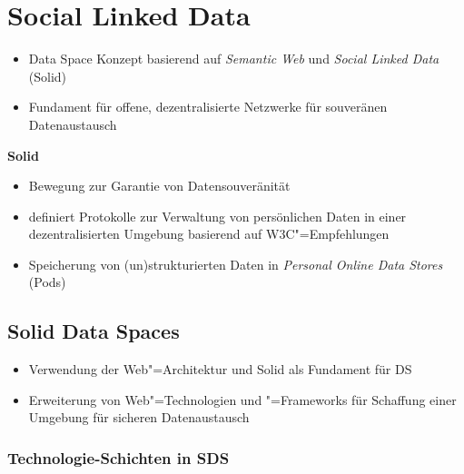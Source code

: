 
\section{Social Linked Data}

\begin{itemize}
    \item Data Space Konzept basierend auf \emph{Semantic Web} und \emph{Social Linked Data} (Solid)
    \item Fundament für offene, dezentralisierte Netzwerke für souveränen Datenaustausch~\cite{mecklerWebLinkedData2023}
\end{itemize}

\vspace{1cm}

\textbf{Solid}
\begin{itemize}
    \item Bewegung zur Garantie von Datensouveränität~\cite{mecklerWebLinkedData2023}
    \item definiert Protokolle zur Verwaltung von persönlichen Daten in einer dezentralisierten Umgebung basierend auf W3C"=Empfehlungen~\cite{mecklerWebLinkedData2023}
    \item Speicherung von (un)strukturierten Daten in \emph{Personal Online Data Stores} (Pods)~\cite{mecklerWebLinkedData2023}
\end{itemize}


\subsection{Solid Data Spaces}

\begin{itemize}
    \item Verwendung der Web"=Architektur und Solid als Fundament für DS
    \item Erweiterung von Web"=Technologien und "=Frameworks für Schaffung einer Umgebung für sicheren Datenaustausch~\cite{mecklerWebLinkedData2023}
\end{itemize}

\subsubsection{Technologie-Schichten in SDS}

